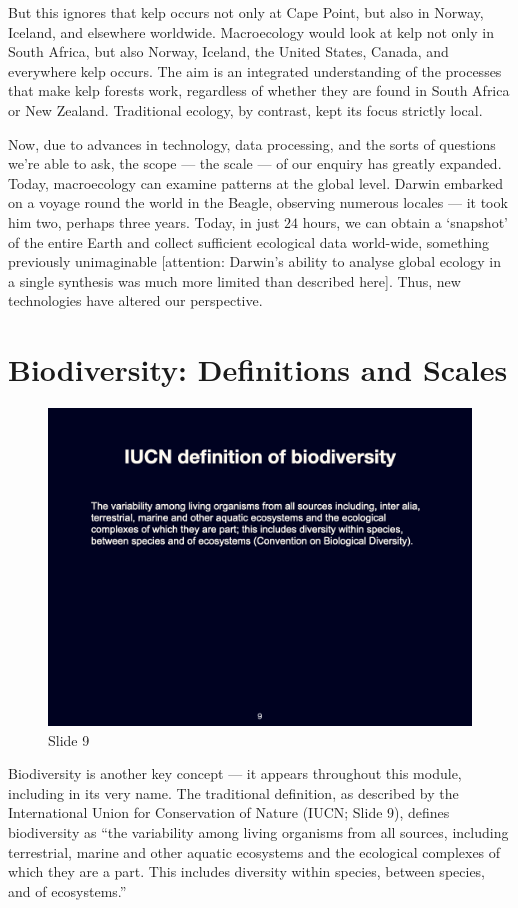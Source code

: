 \documentclass[
  10pt,
]{book}
\begin{document}
But this ignores that kelp occurs not only at Cape Point, but also in
Norway, Iceland, and elsewhere worldwide. Macroecology would look at
kelp not only in South Africa, but also Norway, Iceland, the United
States, Canada, and everywhere kelp occurs. The aim is an integrated
understanding of the processes that make kelp forests work, regardless
of whether they are found in South Africa or New Zealand. Traditional
ecology, by contrast, kept its focus strictly local.

Now, due to advances in technology, data processing, and the sorts of
questions we're able to ask, the scope --- the scale --- of our enquiry
has greatly expanded. Today, macroecology can examine patterns at the
global level. Darwin embarked on a voyage round the world in the Beagle,
observing numerous locales --- it took him two, perhaps three years.
Today, in just \(24\) hours, we can obtain a `snapshot' of the entire
Earth and collect sufficient ecological data world-wide, something
previously unimaginable {[}attention: Darwin's ability to analyse global
ecology in a single synthesis was much more limited than described
here{]}. Thus, new technologies have altered our perspective.

\section{Biodiversity: Definitions and
Scales}\label{biodiversity-definitions-and-scales}

\begin{figure}[ht]
\centering
\includegraphics[width=0.8\linewidth]{../images/BDC334/BDC334-009.jpeg}
\caption*{Slide 9}
\end{figure}

Biodiversity is another key concept --- it appears throughout this
module, including in its very name. The traditional definition, as
described by the International Union for Conservation of Nature (IUCN;
Slide 9), defines biodiversity as ``the variability among living
organisms from all sources, including terrestrial, marine and other
aquatic ecosystems and the ecological complexes of which they are a
part. This includes diversity within species, between species, and of
ecosystems.''
\end{document}
